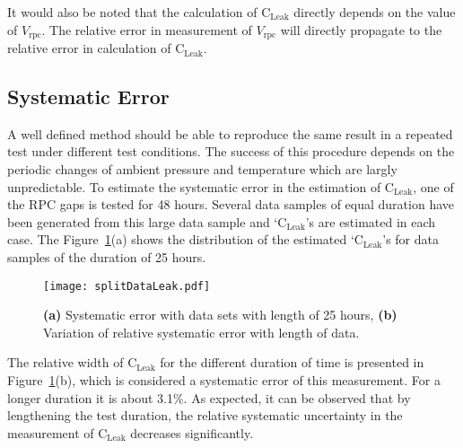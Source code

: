 It would also be noted that the calculation of $\textrm{C}_{\textrm{Leak}}$
directly depends on the value of $V_{\textrm{rpc}}$. The relative error in
measurement of $V_{\textrm{rpc}}$ will directly propagate to the relative
error in calculation of $\textrm{C}_{\textrm{Leak}}$.

\subsection{Systematic Error}
A well defined method should be able to reproduce the same result in a
repeated test under different test conditions.
The success of this procedure depends on the periodic changes of
ambient pressure and temperature which are largly unpredictable.
To estimate the systematic error in the estimation of
$\textrm{C}_{\textrm{Leak}}$, one of the RPC gaps is tested for 48 hours.
Several data samples of equal duration have been generated from this
large data sample and `$\textrm{C}_{\textrm{Leak}}$'s are estimated in
each case. The Figure~\ref{fig:systematic}(a) shows the distribution
of the estimated `$\textrm{C}_{\textrm{Leak}}$'s for data samples of the
duration of 25 hours.
\begin{figure}
  \centering
  \texttt{[image: splitDataLeak.pdf]}
  \caption{\textbf{(a)} Systematic error with data sets with length of
    25 hours, \textbf{(b)} Variation of relative systematic error with
    length of data.}
  \label{fig:systematic}
\end{figure}
The relative width of $\textrm{C}_{\text{Leak}}$ for the different
duration of time is presented in Figure~\ref{fig:systematic}(b),
which is considered a systematic error of this measurement. For a
longer duration it is about 3.1\%.
As expected, it can be observed that by lengthening the test duration,
the relative systematic uncertainty in the measurement of
$\textrm{C}_{\textrm{Leak}}$ decreases significantly.

